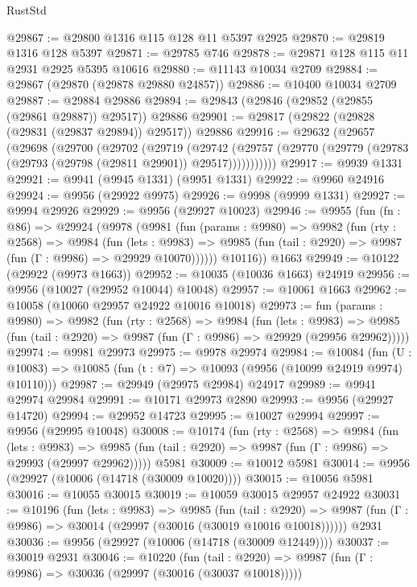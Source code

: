 \begin{lexlean}{RustStd}
\begin{coremodule}
@29867 := @29800 @1316 @115 @128 @11 @5397 @2925
@29870 := @29819 @1316 @128 @5397
@29871 := @29785 @746
@29878 := @29871 @128 @115 @11 @2931 @2925 @5395 @10616
@29880 := @11143 @10034 @2709
@29884 := @29867 (@29870 (@29878 @29880 @24857))
@29886 := @10400 @10034 @2709
@29887 := @29884 @29886
@29894 := @29843 (@29846 (@29852 (@29855 (@29861 @29887)) @29517)) @29886
@29901 := @29817 (@29822 (@29828 (@29831 (@29837 @29894)) @29517)) @29886
@29916 := @29632
    (@29657
      (@29698
        (@29700
          (@29702
            (@29719
              (@29742
                (@29757 (@29770 (@29779 (@29783 (@29793 (@29798 (@29811 @29901)) @29517)))))))))))
@29917 := @9939 @1331
@29921 := @9941 (@9945 @1331) (@9951 @1331)
@29922 := @9960 @24916
@29924 := @9956 (@29922 @9975)
@29926 := @9998 (@9999 @1331)
@29927 := @9994 @29926
@29929 := @9956 (@29927 @10023)
@29946 := @9955
    (fun (fn : @86) =>
    @29924
      (@9978
        (@9981
          (fun (params : @9980) =>
          @9982
            (fun (rty : @2568) =>
            @9984
              (fun (lets : @9983) =>
              @9985 (fun (tail : @2920) => @9987 (fun (Γ : @9986) => @29929 @10070))))))
        @10116))
    @1663
@29949 := @10122 (@29922 (@9973 @1663))
@29952 := @10035 (@10036 @1663) @24919
@29956 := @9956 (@10027 (@29952 @10044) @10048)
@29957 := @10061 @1663
@29962 := @10058 (@10060 @29957 @24922 @10016 @10018)
@29973 := fun (params : @9980) =>
  @9982
    (fun (rty : @2568) =>
    @9984
      (fun (lets : @9983) =>
      @9985 (fun (tail : @2920) => @9987 (fun (Γ : @9986) => @29929 (@29956 @29962)))))
@29974 := @9981 @29973
@29975 := @9978 @29974
@29984 := @10084
    (fun (U : @10083) => @10085 (fun (t : @7) => @10093 (@9956 (@10099 @24919 @9974) @10110)))
@29987 := @29949 (@29975 @29984) @24917
@29989 := @9941 @29974 @29984
@29991 := @10171 @29973 @2890
@29993 := @9956 (@29927 @14720)
@29994 := @29952 @14723
@29995 := @10027 @29994
@29997 := @9956 (@29995 @10048)
@30008 := @10174
    (fun (rty : @2568) =>
    @9984
      (fun (lets : @9983) =>
      @9985 (fun (tail : @2920) => @9987 (fun (Γ : @9986) => @29993 (@29997 @29962)))))
    @5981
@30009 := @10012 @5981
@30014 := @9956 (@29927 (@10006 (@14718 (@30009 @10020))))
@30015 := @10056 @5981
@30016 := @10055 @30015
@30019 := @10059 @30015 @29957 @24922
@30031 := @10196
    (fun (lets : @9983) =>
    @9985
      (fun (tail : @2920) =>
      @9987 (fun (Γ : @9986) => @30014 (@29997 (@30016 (@30019 @10016 @10018))))))
    @2931
@30036 := @9956 (@29927 (@10006 (@14718 (@30009 @12449))))
@30037 := @30019 @2931
@30046 := @10220
    (fun (tail : @2920) => @9987 (fun (Γ : @9986) => @30036 (@29997 (@30016 (@30037 @10018)))))

\end{coremodule}
\end{lexlean}
